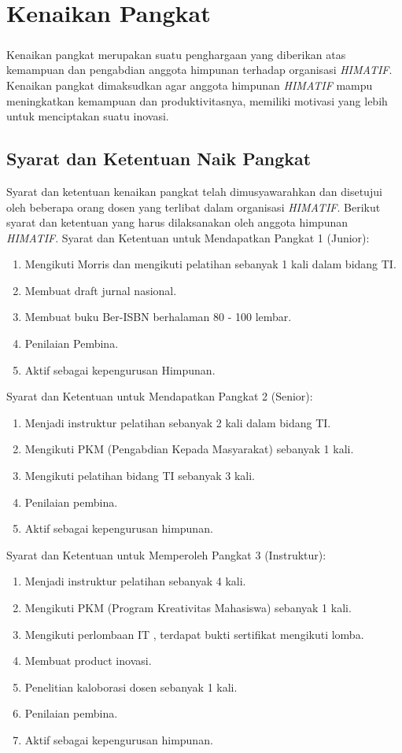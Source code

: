 \chapter{Kenaikan Pangkat}
\paragraph{}Kenaikan pangkat merupakan suatu penghargaan yang diberikan atas kemampuan dan pengabdian anggota himpunan terhadap organisasi \textit{HIMATIF}. Kenaikan pangkat dimaksudkan agar anggota himpunan \textit{HIMATIF} mampu meningkatkan kemampuan dan produktivitasnya, memiliki motivasi yang lebih untuk menciptakan suatu inovasi.

\section{Syarat dan Ketentuan Naik Pangkat}
Syarat dan ketentuan kenaikan pangkat telah dimusyawarahkan dan disetujui oleh beberapa orang dosen yang terlibat dalam organisasi \textit{HIMATIF}. Berikut syarat dan ketentuan yang harus dilaksanakan oleh anggota himpunan \textit{HIMATIF}.
Syarat dan Ketentuan untuk Mendapatkan Pangkat 1 (Junior):
\begin{enumerate}
 \item Mengikuti Morris dan mengikuti pelatihan sebanyak 1 kali dalam bidang TI.
 \item Membuat draft jurnal nasional.
 \item Membuat buku Ber-ISBN berhalaman 80 - 100 lembar.
 \item Penilaian Pembina.
 \item Aktif sebagai kepengurusan Himpunan.
\end{enumerate}
Syarat dan Ketentuan untuk Mendapatkan Pangkat 2 (Senior):
\begin{enumerate}
 \item Menjadi instruktur pelatihan sebanyak 2 kali dalam bidang TI.
 \item Mengikuti PKM (Pengabdian Kepada Masyarakat) sebanyak 1 kali.
 \item Mengikuti pelatihan bidang TI sebanyak 3 kali.
 \item Penilaian pembina.
 \item Aktif sebagai kepengurusan himpunan.
\end{enumerate}
Syarat dan Ketentuan untuk Memperoleh Pangkat 3 (Instruktur):
\begin{enumerate}
 \item Menjadi instruktur pelatihan sebanyak 4 kali.
 \item Mengikuti PKM (Program Kreativitas Mahasiswa) sebanyak 1 kali.
 \item Mengikuti perlombaan IT , terdapat bukti sertifikat mengikuti lomba.
 \item Membuat product inovasi.
 \item Penelitian kaloborasi dosen sebanyak 1 kali.
 \item Penilaian pembina.
 \item Aktif sebagai kepengurusan himpunan.
\end{enumerate}

